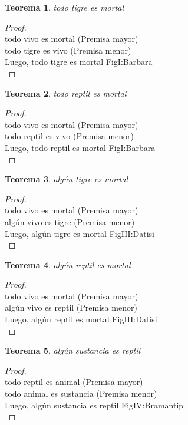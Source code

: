 ﻿\documentclass[12pt]{book}
\newtheorem{theorem}{Teorema}[chapter]
\newtheorem{proof}{Demostración}
\begin{document}
\begin{theorem}
todo tigre es mortal
\label{th: 62}
\end{theorem}\begin{proof}\\todo vivo es mortal	 (Premisa mayor) \\todo tigre es vivo	 (Premisa menor) \\Luego, todo tigre es mortal	FigI:Barbara \\ \end{proof}
\begin{theorem}
todo reptil es mortal
\label{th: 63}
\end{theorem}\begin{proof}\\todo vivo es mortal	 (Premisa mayor) \\todo reptil es vivo	 (Premisa menor) \\Luego, todo reptil es mortal	FigI:Barbara \\ \end{proof}
\begin{theorem}
algún tigre es mortal
\label{th: 64}
\end{theorem}\begin{proof}\\todo vivo es mortal	 (Premisa mayor) \\algún vivo es tigre	 (Premisa menor) \\Luego, algún tigre es mortal	FigIII:Datisi \\ \end{proof}
\begin{theorem}
algún reptil es mortal
\label{th: 65}
\end{theorem}\begin{proof}\\todo vivo es mortal	 (Premisa mayor) \\algún vivo es reptil	 (Premisa menor) \\Luego, algún reptil es mortal	FigIII:Datisi \\ \end{proof}
\begin{theorem}
algún sustancia es reptil
\label{th: 66}
\end{theorem}\begin{proof}\\todo reptil es animal	 (Premisa mayor) \\todo animal es sustancia	 (Premisa menor) \\Luego, algún sustancia es reptil	FigIV:Bramantip \\ \end{proof}
\end{document}
